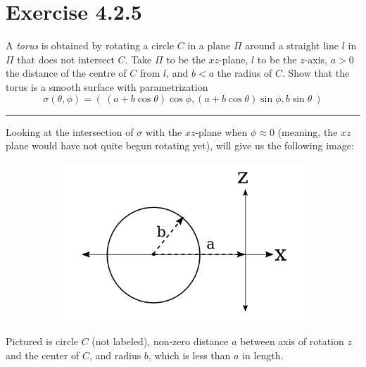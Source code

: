 \documentclass[12pt]{article}
\begin{document}
\maketitle

\section*{Exercise 4.2.5}
\indent
A \emph{torus} is obtained by rotating a circle $C$ in a plane $\Pi$ around a straight line $l$ in $\Pi$ that does not intersect $C$. Take $\Pi$ to be the $xz$-plane, $l$ to be the $z$-axis, $a>0$ the distance of the centre of $C$ from $l$, and $b < a$ the radius of $C$. Show that the torus is a smooth surface with parametrization
$$
\sigma(\theta,\phi) = ( \ (a+b\cos \theta)\cos \phi, (a+b\cos \theta)\sin \phi, b \sin \theta \ )
$$

\vspace{1cm}
\hrule
\vspace{1cm}
\noindent

\indent
Looking at the intersection of $\sigma$ with the $xz$-plane when $\phi \approx 0$ (meaning, the $xz$ plane would have not quite begun rotating yet), will give us the following image:

\begin{figure}[h!]
\centering
	\begin{subfigure}[b]{0.5\linewidth}
		\includegraphics[width=\linewidth]{./assets/4-2-5/torus-xz-intersection.png}
	\end{subfigure}
\end{figure}
\indent

Pictured is circle $C$ (not labeled), non-zero distance $a$ between axis of rotation $z$ and the center of $C$, and radius $b$, which is less than $a$ in length.
\end{document}
